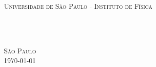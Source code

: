 \begin{titlepage}
\begin{fullwidth}
\begin{center}


\textsc{\LARGE Universidade de São Paulo - Instituto de Física}\\[3cm]

\HRule \\[0.4cm]
\textsc{\textit{\titlefont {\titletext}\\[.3cm] \subtitlefont {\subtitletext}}}
\HRule\\[2.2cm]
\textsc{\LARGE \authorinfo }
\vfill

\textsc{\LARGE São Paulo}\\
\textsc{\LARGE \today}

\end{center}
\end{fullwidth}
\end{titlepage}